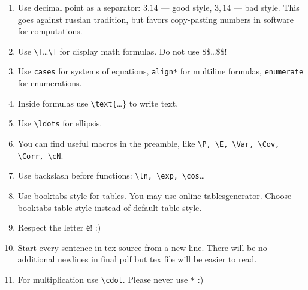 \documentclass[11pt, a4paper]{article}
\DeclareMathOperator{\Var}{Var}
\DeclareMathOperator{\Cov}{Cov}
\DeclareMathOperator{\Corr}{Corr}
\DeclareMathOperator{\E}{\mathbb{E}}
\let\P\relax
\DeclareMathOperator{\P}{\mathbb{P}}
\newcommand{\cN}{\mathcal{N}}
\theoremstyle{definition}
\begin{document}
\begin{enumerate}

\item Use decimal point as a separator: $3.14$ — good style, $3{,}14$ — bad style.
This goes against russian tradition, but favors copy-pasting numbers in software for computations. 
\item Use \verb|\[|\ldots\verb|\]| for display math formulas. Do not use \$\$\ldots\$\$!
\item Use \verb|cases| for systems of equations,
\verb|align*| for multiline formulas, \verb|enumerate| for enumerations.
\item Inside formulas use \verb|\text{|\ldots\} to write text.
\item Use \verb|\ldots| for ellipsis.
\item You can find useful macros in the preamble, like \verb|\P, \E, \Var, \Cov, \Corr, \cN|.
\item Use backslash before functions: \verb|\ln, \exp, \cos|\ldots
\item Use booktabs style for tables. You may use online \href{https://www.tablesgenerator.com}{tablesgenerator}. 
Choose booktabs table style instead of default table style.
\item Respect the letter ё! :)
\item Start every sentence in tex source from a new line. 
There will be no additional newlines in final pdf but tex file will be easier to read.
\item For multiplication use \verb|\cdot|. Please never use \verb|*| :)
\end{enumerate}













\end{document}
